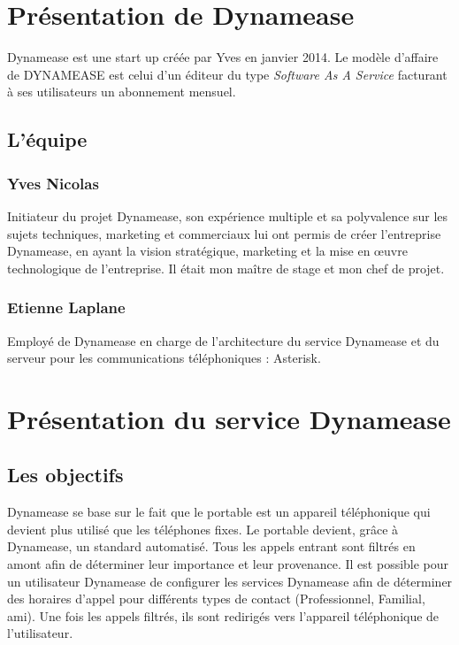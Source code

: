 \section{Présentation de Dynamease}

Dynamease est une start up créée par Yves  en janvier 2014. Le modèle d'affaire de DYNAMEASE est celui d’un éditeur du type \textit{Software As A Service} facturant à ses utilisateurs un abonnement mensuel.

\subsection{L'équipe} 

\subsubsection{Yves Nicolas}

Initiateur du projet Dynamease, son expérience multiple et sa polyvalence sur les sujets techniques, marketing et commerciaux lui ont permis de créer l’entreprise Dynamease, en ayant la vision stratégique, marketing et la mise en œuvre technologique de l’entreprise. Il était mon maître de stage et mon chef de projet.

\subsubsection{Etienne Laplane}

Employé de Dynamease en charge de l’architecture du service Dynamease et du serveur pour les communications téléphoniques : Asterisk.


\section{Présentation du service Dynamease}

\subsection{Les objectifs}

Dynamease se base sur le fait que le portable est un appareil téléphonique qui devient plus utilisé que les téléphones fixes. Le portable devient, grâce à Dynamease, un standard automatisé. Tous les appels entrant sont filtrés en amont afin de déterminer leur importance et leur provenance. Il est possible pour un utilisateur Dynamease de configurer les services Dynamease afin de déterminer des horaires d'appel pour différents types de contact (Professionnel, Familial, ami). Une fois les appels filtrés, ils sont redirigés vers l'appareil téléphonique de l'utilisateur.


